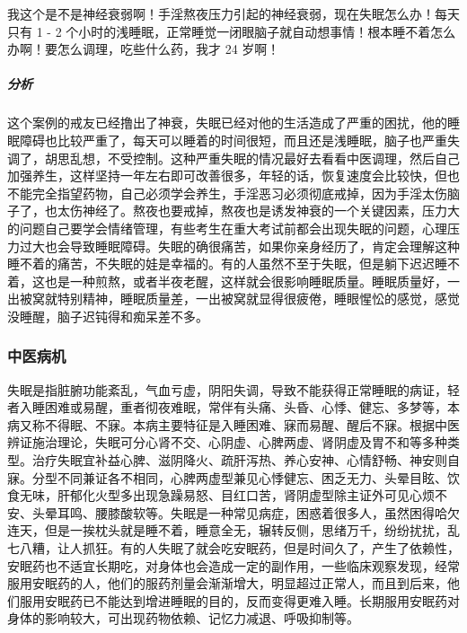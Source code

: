 \begin{case}
    我这个是不是神经衰弱啊！手淫熬夜压力引起的神经衰弱，现在失眠怎么办！每天只有 1 - 2 个小时的浅睡眠，正常睡觉一闭眼脑子就自动想事情！根本睡不着怎么办啊！要怎么调理，吃些什么药，我才 24 岁啊！
    \subparagraph{分析} 这个案例的戒友已经撸出了神衰，失眠已经对他的生活造成了严重的困扰，他的睡眠障碍也比较严重了，每天可以睡着的时间很短，而且还是浅睡眠，脑子也严重失调了，胡思乱想，不受控制。这种严重失眠的情况最好去看看中医调理，然后自己加强养生，这样坚持一年左右即可改善很多，年轻的话，恢复速度会比较快，但也不能完全指望药物，自己必须学会养生，手淫恶习必须彻底戒掉，因为手淫太伤脑子了，也太伤神经了。熬夜也要戒掉，熬夜也是诱发神衰的一个关键因素，压力大的问题自己要学会情绪管理，有些考生在重大考试前都会出现失眠的问题，心理压力过大也会导致睡眠障碍。失眠的确很痛苦，如果你亲身经历了，肯定会理解这种睡不着的痛苦，不失眠的娃是幸福的。有的人虽然不至于失眠，但是躺下迟迟睡不着，这也是一种煎熬，或者半夜老醒，这样就会很影响睡眠质量。睡眠质量好，一出被窝就特别精神，睡眠质量差，一出被窝就显得很疲倦，睡眼惺忪的感觉，感觉没睡醒，脑子迟钝得和痴呆差不多。
\end{case}

\subsubsection{中医病机}

失眠是指脏腑功能紊乱，气血亏虚，阴阳失调，导致不能获得正常睡眠的病证，轻者入睡困难或易醒，重者彻夜难眠，常伴有头痛、头昏、心悸、健忘、多梦等，本病又称不得眠、不寐。本病主要特征是入睡困难、寐而易醒、醒后不寐。根据中医辨证施治理论，失眠可分心肾不交、心阴虚、心脾两虚、肾阴虚及胃不和等多种类型。治疗失眠宜补益心脾、滋阴降火、疏肝泻热、养心安神、心情舒畅、神安则自寐。分型不同兼证各不相同，心脾两虚型兼见心悸健忘、困乏无力、头晕目眩、饮食无味，肝郁化火型多出现急躁易怒、目红口苦，肾阴虚型除主证外可见心烦不安、头晕耳鸣、腰膝酸软等。失眠是一种常见病症，困惑着很多人，虽然困得哈欠连天，但是一挨枕头就是睡不着，睡意全无，辗转反侧，思绪万千，纷纷扰扰，乱七八糟，让人抓狂。有的人失眠了就会吃安眠药，但是时间久了，产生了依赖性，安眠药也不适宜长期吃，对身体也会造成一定的副作用，一些临床观察发现，经常服用安眠药的人，他们的服药剂量会渐渐增大，明显超过正常人，而且到后来，他们服用安眠药已不能达到增进睡眠的目的，反而变得更难入睡。长期服用安眠药对身体的影响较大，可出现药物依赖、记忆力减退、呼吸抑制等。

